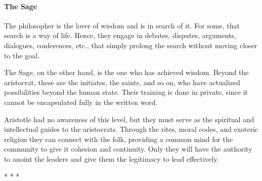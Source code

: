 \paragraph{The Sage}


The philosopher is the lover of wisdom and is in search of it. For some, that search is a way of life. Hence, they engage in debates, disputes, arguments, dialogues, conferences, etc., that simply prolong the search without moving closer to the goal.

The Sage, on the other hand, is the one who has achieved wisdom. Beyond the aristocrat, these are the initiates, the saints, and so on, who have actualized possibilities beyond the human state. Their training is done in private, since it cannot be encapsulated fully in the written word.

Aristotle had no awareness of this level, but they must serve as the spiritual and intellectual guides to the aristocrats. Through the rites, moral codes, and exoteric religion they can connect with the folk, providing a common mind for the community to give it cohesion and continuity. Only they will have the authority to anoint the leaders and give them the legitimacy to lead effectively.



\begin{center}* * *\end{center}

